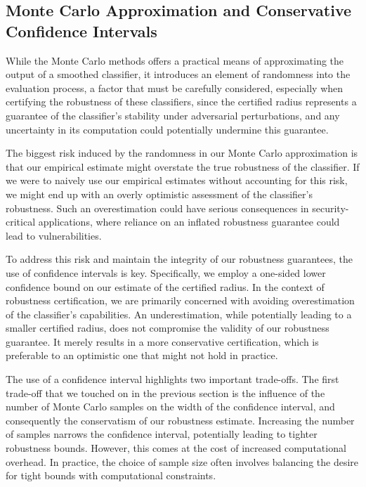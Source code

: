 \subsection{Monte Carlo Approximation and Conservative Confidence Intervals}\label{subsec:monte-carlo-approximation-and-conservative-confidence-intervals}

While the Monte Carlo methods offers a practical means of approximating the output of a smoothed classifier, it introduces an element of randomness into the evaluation process, a factor that must be carefully considered, especially when certifying the robustness of these classifiers, since the certified radius represents a guarantee of the classifier's stability under adversarial perturbations, and any uncertainty in its computation could potentially undermine this guarantee.

The biggest risk induced by the randomness in our Monte Carlo approximation is that our empirical estimate might overstate the true robustness of the classifier.
If we were to naively use our empirical estimates without accounting for this risk, we might end up with an overly optimistic assessment of the classifier's robustness.
Such an overestimation could have serious consequences in security-critical applications, where reliance on an inflated robustness guarantee could lead to vulnerabilities.

To address this risk and maintain the integrity of our robustness guarantees, the use of confidence intervals is key.
Specifically, we employ a one-sided lower confidence bound on our estimate of the certified radius.
In the context of robustness certification, we are primarily concerned with avoiding overestimation of the classifier's capabilities.
An underestimation, while potentially leading to a smaller certified radius, does not compromise the validity of our robustness guarantee.
It merely results in a more conservative certification, which is preferable to an optimistic one that might not hold in practice.

The use of a confidence interval highlights two important trade-offs.
The first trade-off that we touched on in the previous section is the influence of the number of Monte Carlo samples on the width of the confidence interval, and consequently the conservatism of our robustness estimate.
Increasing the number of samples narrows the confidence interval, potentially leading to tighter robustness bounds.
However, this comes at the cost of increased computational overhead.
In practice, the choice of sample size often involves balancing the desire for tight bounds with computational constraints.

